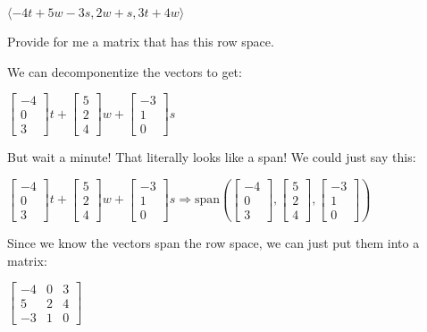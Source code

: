 \documentclass[
  letterpaper,
  DIV=11,
  numbers=noendperiod]{scrartcl}
\begin{document}
\(\langle -4t + 5w - 3s, 2w + s, 3t + 4w \rangle\)

Provide for me a matrix that has this row space.

We can decomponentize the vectors to get:

\(\begin{bmatrix}-4 \\ 0 \\ 3\end{bmatrix}t + \begin{bmatrix}5 \\ 2 \\ 4\end{bmatrix}w + \begin{bmatrix}-3 \\ 1 \\ 0\end{bmatrix}s\)

But wait a minute! That literally looks like a span! We could just say
this:

\(\begin{bmatrix}-4 \\ 0 \\ 3\end{bmatrix}t + \begin{bmatrix}5 \\ 2 \\ 4\end{bmatrix}w + \begin{bmatrix}-3 \\ 1 \\ 0\end{bmatrix}s \Rightarrow \mathrm{span}\left(\begin{bmatrix}-4 \\ 0 \\ 3\end{bmatrix}, \begin{bmatrix}5 \\ 2 \\ 4\end{bmatrix}, \begin{bmatrix}-3 \\ 1 \\ 0\end{bmatrix}\right)\)

Since we know the vectors span the row space, we can just put them into
a matrix:

\(\begin{bmatrix}-4 & 0 & 3 \\ 5 & 2 & 4 \\ -3 & 1 & 0\end{bmatrix}\)
\end{document}
